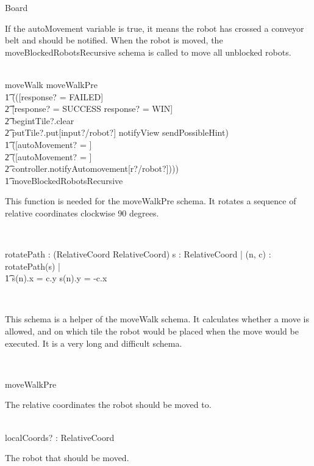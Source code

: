 \documentclass[12pt]{article}
\begin{document}
\begin{class}{Board}
\begin{zpar}
If the autoMovement variable is true, it means the robot has crossed a conveyor belt and should be notified. When the robot is moved, the moveBlockedRobotsRecursive schema is called to move all unblocked robots.
\end{zpar} \\
moveWalk \sdef moveWalkPre \; \; \comp \\ \t1 (([response? = FAILED] \; \; [] \\ \t2 [response? = SUCCESS \vee response? = WIN] \;\; \wedge \\ \t2 begintTile?.clear \; \; \wedge \\ \t2 putTile?.put[input?/robot?] \wedge notifyView \wedge sendPossibleHint) \; \; \wedge \\ \t1 ([autoMovement? = \false] \; \; [] \\ \t2 ([autoMovement? = \true] \; \; \wedge \\ \t2 controller.notifyAutomovement[r?/robot?]))) \; \; \comp \\ \t1
moveBlockedRobotsRecursive \\
\begin{zpar}
This function is needed for the moveWalkPre schema. It rotates a sequence of relative coordinates clockwise 90 degrees.
\end{zpar} \\
\begin{axdef}
rotatePath : \power (\seq RelativeCoord \fun \seq RelativeCoord)
\where
\forall s : \seq RelativeCoord | \forall (n, c) : rotatePath(s) | \\ \t1
s(n).x = c.y \wedge s(n).y = -c.x
\end{axdef} \\
\begin{zpar}
This schema is a helper of the moveWalk schema. It calculates whether a move is allowed, and on which tile the robot would be placed when the move would be executed. It is a very long and difficult schema.
\end{zpar} \\
\begin{nobottomschema}{moveWalkPre}
\begin{zpar}
The relative coordinates the robot should be moved to.
\end{zpar} \\
localCoords? : RelativeCoord \\
\begin{zpar}
The robot that should be moved.
\end{zpar} \\

\end{nobottomschema}
\end{class}
\end{document}
